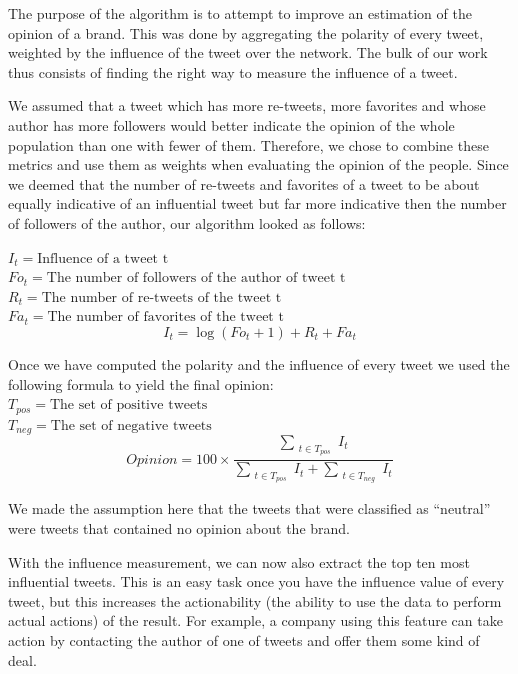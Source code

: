 \documentclass[a4paper,12pt]{report}
\begin{document}
The purpose of the algorithm is to attempt to improve an estimation of the opinion of a brand. 
This was done by aggregating the polarity of every tweet, weighted by the influence of the tweet over the network.
The bulk of our work thus consists of finding the right way to measure the influence of a tweet.

We assumed that a tweet which has more re-tweets, more favorites and whose author has more followers would better indicate the opinion of the whole population than one with fewer of them. Therefore, we chose to combine these metrics and use them as weights when evaluating the opinion of the people. Since we deemed that the number of re-tweets and favorites of a tweet to be about equally indicative of an influential tweet but far more indicative then the number of followers of the author, our algorithm looked as follows:

$I_t = \text{Influence of a tweet t}$\\
$Fo_t = \text{The number of followers of the author of tweet t}$\\
$R_t = \text{The number of re-tweets of the tweet t}$\\
$Fa_t = \text{The number of favorites of the tweet t}$\\
\begin{equation}
I_t = \log (Fo_t + 1) + R_t + Fa_t
\end{equation}

Once we have computed the polarity and the influence of every tweet we used the following formula to yield the final opinion:\\
$T_{pos} = \text{The set of positive tweets}$\\
$T_{neg} = \text{The set of negative tweets}$\\
\begin{equation}
Opinion = 100 \times \frac{\sum_{\substack{t \in T_{pos}}} I_t}{\sum_{\substack{t \in T_{pos}}} I_t + \sum_{\substack{t \in T_{neg}}} I_t}
\end{equation}

We made the assumption here that the tweets that were classified as ``neutral'' were tweets that contained no opinion about the brand.

With the influence measurement, we can now also extract the top ten most influential tweets. This is an easy task once you have the influence value of every tweet, but this increases the actionability (the ability to use the data to perform actual actions) of the result. For example, a company using this feature can take action by contacting the author of one of tweets and offer them some kind of deal.
\end{document}
